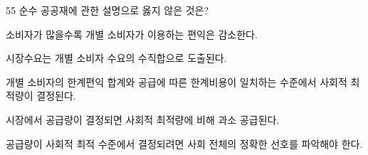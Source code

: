 \begin{question}{55}
순수 공공재에 관한 설명으로 옳지 않은 것은?
\begin{choices}
  \item 소비자가 많을수록 개별 소비자가 이용하는 편익은 감소한다.
  \item 시장수요는 개별 소비자 수요의 수직합으로 도출된다.
  \item 개별 소비자의 한계편익 합계와 공급에 따른 한계비용이 일치하는 수준에서 사회적 최적량이 결정된다.
  \item 시장에서 공급량이 결정되면 사회적 최적량에 비해 과소 공급된다.
  \item 공급량이 사회적 최적 수준에서 결정되려면 사회 전체의 정확한 선호를 파악해야 한다.
\end{choices}
\end{question}

